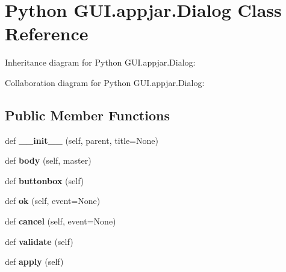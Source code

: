 \hypertarget{class_python_01_g_u_i_1_1appjar_1_1_dialog}{}\section{Python G\+U\+I.\+appjar.\+Dialog Class Reference}
\label{class_python_01_g_u_i_1_1appjar_1_1_dialog}


Inheritance diagram for Python G\+U\+I.\+appjar.\+Dialog\+:


Collaboration diagram for Python G\+U\+I.\+appjar.\+Dialog\+:
\subsection*{Public Member Functions}
\begin{DoxyCompactItemize}
\item 
\mbox{\label{class_python_01_g_u_i_1_1appjar_1_1_dialog_a3be1f69f816f94f9bad6107cf2948a9c}} 
def {\bfseries \+\_\+\+\_\+init\+\_\+\+\_\+} (self, parent, title=None)
\item 
\mbox{\label{class_python_01_g_u_i_1_1appjar_1_1_dialog_a85585d0732e9d6f4cd331fbe59b4dc6e}} 
def {\bfseries body} (self, master)
\item 
\mbox{\label{class_python_01_g_u_i_1_1appjar_1_1_dialog_a572f4e77ac4fa3c6ecdd1a1a5c86b5f6}} 
def {\bfseries buttonbox} (self)
\item 
\mbox{\label{class_python_01_g_u_i_1_1appjar_1_1_dialog_a38abe607d63edc4a31d8b56c27061fa4}} 
def {\bfseries ok} (self, event=None)
\item 
\mbox{\label{class_python_01_g_u_i_1_1appjar_1_1_dialog_a351568a83d7e35de38eb9d9896c83bc4}} 
def {\bfseries cancel} (self, event=None)
\item 
\mbox{\label{class_python_01_g_u_i_1_1appjar_1_1_dialog_ad43e87dd0ba3e2f32bcc1f8f21e894f9}} 
def {\bfseries validate} (self)
\item 
\mbox{\label{class_python_01_g_u_i_1_1appjar_1_1_dialog_ade992e51490778dc4e0a7bad0bb9a717}} 
def {\bfseries apply} (self)
\end{DoxyCompactItemize}
